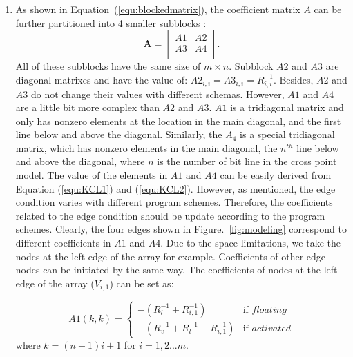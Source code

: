 \begin{enumerate}
  \item
  As shown in Equation~(\ref{equ:blockedmatrix}), the coefficient matrix $A$ can be further partitioned into 4 smaller subblocks :
    \begin{equation}\label{equ:blockedmatrix}
        \mathbf{A} = \left[
        \begin{array}{cc}
            A1 & A2  \\
            A3 & A4  \\
        \end{array} \right].
    \end{equation}
All of these subblocks have the same size of $m\times n$. Subblock $A2$ and $A3$ are diagonal matrixes and have the value of: $A2_{i,i} = A3_{i,i} = R_{i,i}^{-1}$. Besides, $A2$ and $A3$ do not change their values with different schemas. However, $A1$ and $A4$ are a little bit more complex than $A2$ and $A3$. $A1$ is a tridiagonal matrix and only has nonzero elements at the location in the main diagonal, and the first line below and above the diagonal. Similarly, the $A_4$ is a special tridiagonal matrix, which has nonzero elements in the main diagonal, the $n^{th}$ line below and above the diagonal, where $n$ is the number of bit line in the cross point model.
The value of the elements in $A1$ and $A4$ can be easily derived from Equation (\ref{equ:KCL1}) and (\ref{equ:KCL2}). However, as mentioned, the edge condition varies with different program schemes. Therefore, the coefficients related to the edge condition should be update according to the program schemes. Clearly, the four edges shown in Figure.~\ref{fig:modeling} correspond to different coefficients in $A1$ and $A4$. Due to the space limitations, we take the nodes at the left edge of the array for example. Coefficients of other edge nodes can be initiated by the same way. The coefficients of nodes at the left edge of the array ($V_{i,1}$) can be set as:

    \begin{equation}
    A1(k,k) = \left\{
    \begin{array}{ll}
    -(R_l^{-1}+R_{i,1}^{-1})   & \text{if } floating\\
    -(R_v^{-1}+R_l^{-1}+R_{i,1}^{-1})& \text{if } activated
    \end{array} \right.
    \end{equation}
    where $k=(n-1)i+1$ for $i=1,2...m$.


\end{enumerate}
